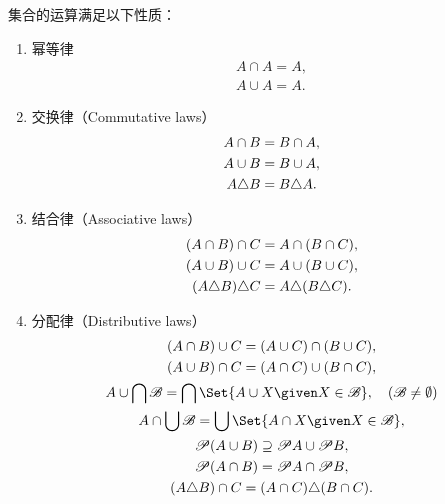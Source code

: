 \begin{property}
集合的运算满足以下性质：
\begin{enumerate}
\item 幂等律
\begin{gather}
	A \cap A = A, \\
	A \cup A = A.
\end{gather}

\item 交换律（{\rm Commutative laws}）
\begin{gather}
	A \cap B = B \cap A, \label{equation:集合论.集合代数公式1-1} \\
	A \cup B = B \cup A, \label{equation:集合论.集合代数公式1-2} \\
	A \triangle B = B \triangle A.
\end{gather}

\item 结合律（{\rm Associative laws}）
\begin{gather}
	(A \cap B) \cap C = A \cap (B \cap C), \label{equation:集合论.集合代数公式2-1} \\
	(A \cup B) \cup C = A \cup (B \cup C), \label{equation:集合论.集合代数公式2-2} \\
	(A \triangle B) \triangle C = A \triangle (B \triangle C).
\end{gather}

\item 分配律（{\rm Distributive laws}）
\begin{gather}
	(A \cap B) \cup C = (A \cup C) \cap (B \cup C), \label{equation:集合论.集合代数公式3-1} \\
	(A \cup B) \cap C = (A \cap C) \cup (B \cap C), \label{equation:集合论.集合代数公式3-2} \\
	A \cup \bigcap \mathscr{B} = \bigcap\Set{A \cup X \given X \in \mathscr{B}}, \quad(\mathscr{B}\neq\emptyset) \label{equation:集合论.集合代数公式3-3} \\
	A \cap \bigcup \mathscr{B} = \bigcup\Set{A \cap X \given X \in \mathscr{B}}, \label{equation:集合论.集合代数公式3-4} \\
	\Powerset (A \cup B) \supseteq \Powerset A \cup \Powerset B, \label{equation:集合论.集合代数公式3-5} \\ %
	\Powerset (A \cap B) = \Powerset A \cap \Powerset B, \label{equation:集合论.集合代数公式3-6} \\ %
	(A \symdiff B) \cap C = (A \cap C) \symdiff (B \cap C).
\end{gather}


\end{enumerate}
\end{property}
